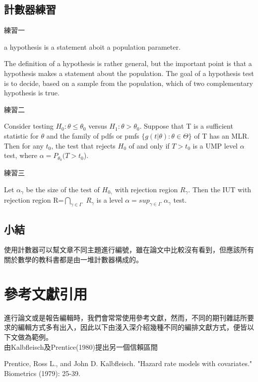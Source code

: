 \section{計數器練習}
\begin{try}練習一\\
\begin{df} a hypothesis is a statement aboit a population parameter.
\end{df} 
The definition of a hypothesis is rather general, but the important point is that a hypothesis makes a statement about the population. The goal of a hypothesis test is to decide, based on a sample from the population, which of two complementary hypothesis is true.
\end{try} 
\begin{try}練習二\\
\begin{thm} \;\;Consider testing $H_0:\theta\leq\theta_0$ versus $H_1:\theta>\theta_0$. Suppose that T is a sufficient statistic for $\theta$ and the family of pdfs or pmfs $\{g(t|\theta):\theta\in\Theta\}$ of T has an MLR. Then for any $t_0$, the test that rejects $H_0$ of and only if $T > t_0$ is a UMP level $\alpha$ test, where $\alpha=P_{\theta_0}(T>t_0$).
\end{thm} 
\end{try}
\begin{try}練習三\\
\begin{lemma} \;\;Let $\alpha_\gamma$ be the size of the test of $H_{0_\gamma}$ with rejection region $R_\gamma$. Then the IUT with rejection region R=$\bigcap_{\gamma\in\Gamma}$ $R_\gamma$ is a level $\alpha=sup_{\gamma\in\Gamma}$ $\alpha_\gamma$ test.
\end{lemma} 
\end{try}
\section*{小結}
使用計數器可以幫文章不同主題進行編號，雖在論文中比較沒有看到，但應該所有關於數學的教科書都是由一堆計數器構成的。
\chapter{參考文獻引用}
進行論文或是報告編輯時，我們會常常使用參考文獻，然而，不同的期刊雜誌所要求的編輯方式多有出入，因此以下由淺入深介紹幾種不同的編排文獻方式，便皆以下文做為範例。\\

由Kalbfleisch及Prentice(1980)提出另一個信賴區間
\begin{description}
\item Prentice, Ross L., and John D. Kalbfleisch. "Hazard rate models with covariates." 
Biometrics (1979): 25-39.
\end{description}
